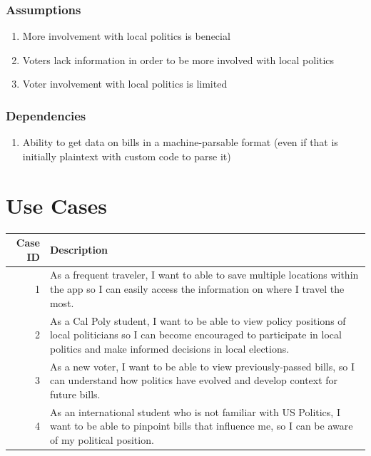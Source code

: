 \documentclass[12pt,oneside,letterpaper]{article}
\begin{document}
\subsubsection{Assumptions}
\begin{enumerate}
\item More involvement with local politics is benecial
\item Voters lack information in order to be more involved with local politics
\item Voter involvement with local politics is limited
\end{enumerate}

\subsubsection{Dependencies}
\begin{enumerate}
\item Ability to get data on bills in a machine-parsable format (even if that is initially plaintext with custom code to parse it)
\end{enumerate}

\section{Use Cases}
\begin{longtable}{|r|p{3.8in}|}
\hline
Case ID & Description \\
\hline
1 & As a frequent traveler, I want to able to save multiple locations within the app so I can easily access the information on where I travel the most.\\
\hline
2 & As a Cal Poly student, I want to be able to view policy positions of local politicians so I can become encouraged to participate in local politics and make informed decisions in local elections.\\
\hline
3 & As a new voter, I want to be able to view previously-passed bills, so I can understand how politics have evolved and develop context for future bills. \\
\hline
4 & As an international student who is not familiar with US Politics, I want to be able to pinpoint bills that influence me, so I can be aware of my political position.\\
\hline
\end{longtable}
\end{document}
